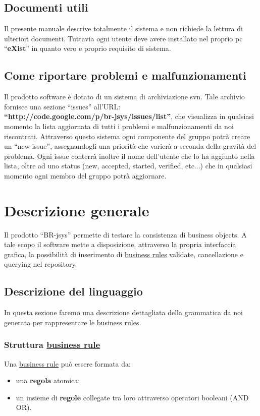 \section{Documenti utili}
Il presente manuale descrive totalmente il sistema e non richiede la lettura di ulteriori documenti. Tuttavia ogni utente deve avere installato nel proprio pc ``\textbf{eXist}'' in quanto vero e proprio requisito di sistema. 
\section{Come riportare problemi e malfunzionamenti}
Il prodotto software \`e dotato di un sistema di archiviazione svn. Tale archivio fornisce una sezione ``issues'' all'URL: \\ 
\textbf{``http://code.google.com/p/br-jsys/issues/list''}, che visualizza in qualsiasi momento la lista aggiornata di tutti i problemi e malfunzionamenti da noi riscontrati. Attraverso questo sistema ogni componente del gruppo potr\`a creare un ``new issue'', assegnandogli una priorit\`a che varier\`a a seconda della gravit\`a del problema. Ogni issue conterr\`a inoltre il nome dell'utente che lo ha aggiunto nella lista, oltre ad uno status (new, accepted, started, verified, etc...) che in qualsiasi momento ogni membro del gruppo potr\`a aggiornare. 

\chapter{Descrizione generale}
Il prodotto ``BR-jsys'' permette di testare la consistenza di business objects. A tale scopo il software mette a disposizione, attraverso la propria interfaccia grafica, la possibilit\`a di inserimento di \underline{business rules} validate, cancellazione e querying nel repository.
\section{Descrizione del linguaggio}
In questa sezione faremo una descrizione dettagliata della grammatica da noi generata per rappresentare le \underline{business rules}. 
\subsection{Struttura \underline{business rule}}
Una \underline{business rule} pu\`o essere formata da:
\begin{itemize}
\item una \textbf{regola} atomica;
\item un insieme di \textbf{regole} collegate tra loro attraverso operatori booleani (AND \textbar OR).
\end{itemize}
